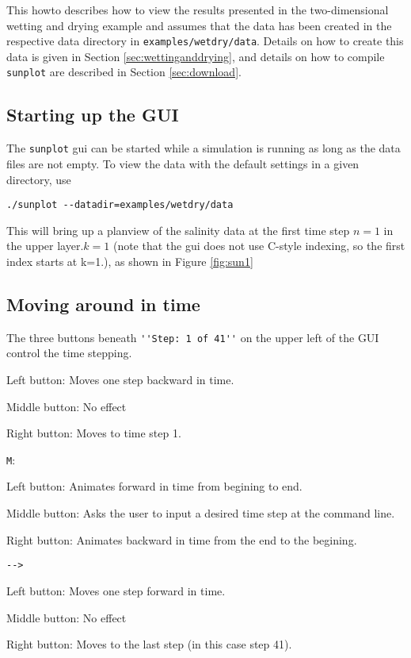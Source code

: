 \documentclass[12pt,oneside]{article}
\begin{document}
This howto describes how to view the results presented in the two-dimensional wetting
and drying example and assumes that the data has been created in the respective data directory
in \verb+examples/wetdry/data+.  Details on how to create this data is given in Section \ref{sec:wettinganddrying},
and details on how to compile \verb+sunplot+ are described in Section \ref{sec:download}.

\subsection{Starting up the GUI}

The \verb+sunplot+ gui can be started while a simulation is running as long as the data files
are not empty.  To view the data with the default settings in a given directory, use
\begin{verbatim}
./sunplot --datadir=examples/wetdry/data
\end{verbatim}
This will bring up a planview of the salinity data at the first time step $n=1$ in the upper layer.$k=1$ (note
that the gui does not use C-style indexing, so the first index starts at k=1.), as shown in Figure
\ref{fig:sun1}

\subsection{Moving around in time}

The three buttons beneath \verb+''Step: 1 of 41''+ on the upper left of the GUI control the time stepping.
\begin{list}{}
\item \button{$<--$}
\begin{list}{}
\item Left button: Moves one step backward in time.
\item Middle button: No effect
\item Right button: Moves to time step 1.
\end{list}
\item \verb+M+: 
\begin{list}{}
\item Left button: Animates forward in time from begining to end.
\item Middle button: Asks the user to input a desired time step at the command line.
\item Right button: Animates backward in time from the end to the begining.
\end{list}
\item \verb+-->+
\begin{list}{}
\item Left button: Moves one step forward in time.
\item Middle button: No effect
\item Right button: Moves to the last step (in this case step 41).
\end{list}
\end{list}
\end{document}
